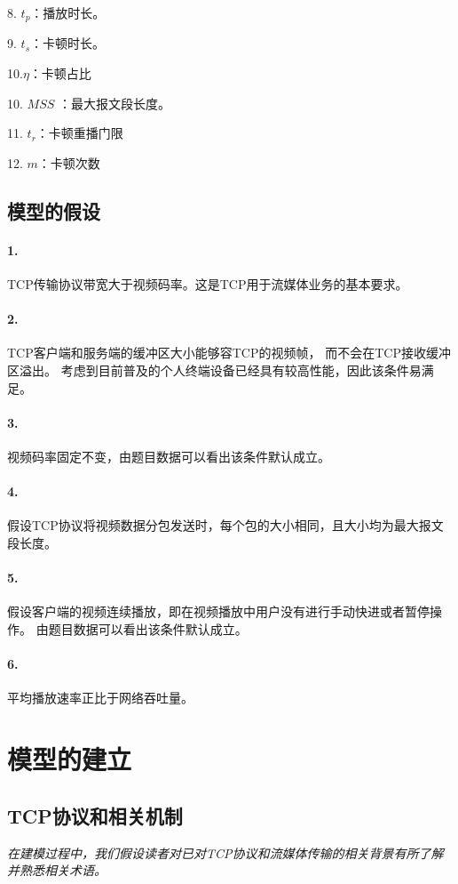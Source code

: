 \documentclass[UTF8]{ctexart}
\begin{document}
8. $t_{p} $：播放时长。

9. $t_{s} $：卡顿时长。

10.$\eta$：卡顿占比

10. $MSS$ ：最大报文段长度。

11. $t_{r}$：卡顿重播门限

12. $m$：卡顿次数

\subsection{模型的假设}
\paragraph{1.}
TCP传输协议带宽大于视频码率。这是TCP用于流媒体业务的基本要求。
\paragraph{2.}
TCP客户端和服务端的缓冲区大小能够容TCP的视频帧， 而不会在TCP接收缓冲区溢出。
考虑到目前普及的个人终端设备已经具有较高性能，因此该条件易满足。
\paragraph{3.}
视频码率固定不变，由题目数据可以看出该条件默认成立。
\paragraph{4.}
假设TCP协议将视频数据分包发送时，每个包的大小相同，且大小均为最大报文段长度。
\paragraph{5.}
假设客户端的视频连续播放，即在视频播放中用户没有进行手动快进或者暂停操作。
由题目数据可以看出该条件默认成立。
\paragraph{6.}
平均播放速率正比于网络吞吐量。

\section{模型的建立}
\subsection{TCP协议和相关机制}
\emph{在建模过程中，我们假设读者对已对TCP协议和流媒体传输的相关背景有所了解并熟悉相关术语。}
\end{document}
